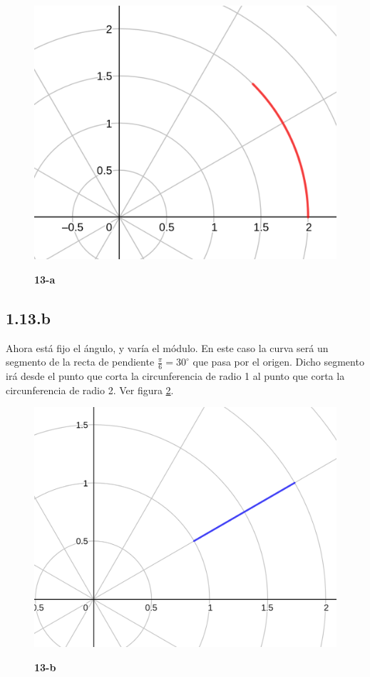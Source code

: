 \documentclass{article}
\begin{document}
\begin{figure}[ht]
\caption{\textbf{13-a}}
\includegraphics[scale=1.4]{../img/exercises/guide_01/13_a.png} 
\centering
\label{fig:1-13-a}
\end{figure}

\subsection*{1.13.b}
\label{subsec:1.13.b}

Ahora está fijo el ángulo, y varía el módulo. En este caso la curva será un segmento de la recta de pendiente $\frac{\pi}{6}= 30^{\circ}$ que pasa por el origen. Dicho segmento irá desde el punto que corta la circunferencia de radio 1 al punto que corta la circunferencia de radio 2. Ver figura \ref{fig:1-13-b}.

\begin{figure}[ht]
\caption{\textbf{13-b}}
\includegraphics[scale=2.35]{../img/exercises/guide_01/13_b.png} 
\centering
\label{fig:1-13-b}
\end{figure}
\end{document}
